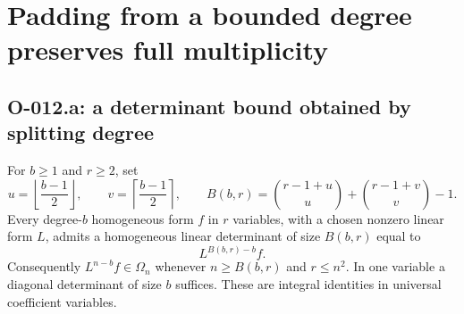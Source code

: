 \section{Padding from a bounded degree preserves full multiplicity}

\subsection{O-012.a: a determinant bound obtained by splitting degree}

For $b\geq1$ and $r\geq2$, set
\[
 u=\left\lfloor\frac{b-1}{2}\right\rfloor,\qquad
 v=\left\lceil\frac{b-1}{2}\right\rceil,\qquad
 B(b,r)=\binom{r-1+u}{u}+\binom{r-1+v}{v}-1.
\]
Every degree-$b$ homogeneous form $f$ in $r$ variables, with a
chosen nonzero linear form $L$, admits a homogeneous linear
determinant of size $B(b,r)$ equal to
\[
                           L^{B(b,r)-b}f.               \tag{O-012.1}
\]
Consequently $L^{n-b}f\in\Omega_n$ whenever $n\geq B(b,r)$
and $r\leq n^2$. In one variable a diagonal determinant of size
$b$ suffices. These are integral identities in universal
coefficient variables.


